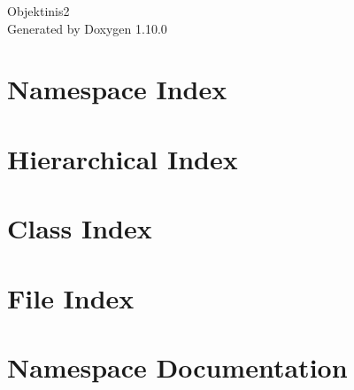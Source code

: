 \documentclass[twoside]{book}
\newcommand{\+}{\discretionary{\mbox{\scriptsize$\hookleftarrow$}}{}{}}
\newcommand{\clearemptydoublepage}{%
    \newpage{\pagestyle{empty}\cleardoublepage}%
  }
\begin{document}
  \raggedbottom
    \hypersetup{pageanchor=false,
                bookmarksnumbered=true,
                pdfencoding=unicode
               }
  \begin{titlepage}
  \vspace*{7cm}
  \begin{center}%
  {\Large Objektinis2}\\
  \vspace*{1cm}
  {\large Generated by Doxygen 1.10.0}\\
  \end{center}
  \end{titlepage}
  \clearemptydoublepage
  \tableofcontents
  \clearemptydoublepage
  \hypersetup{pageanchor=true}

\chapter{Namespace Index}

\chapter{Hierarchical Index}

\chapter{Class Index}

\chapter{File Index}

\chapter{Namespace Documentation}














\end{document}
